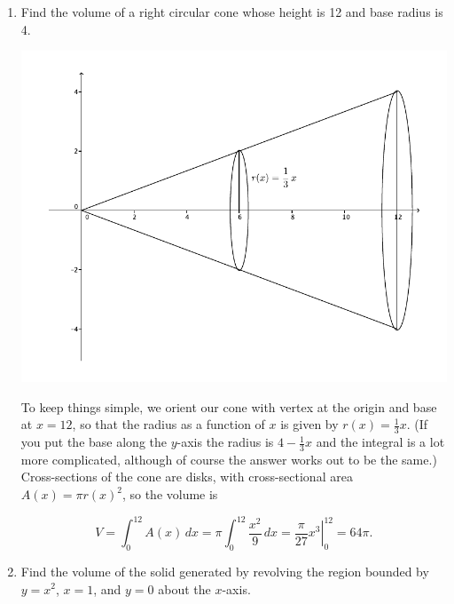 \documentclass[12pt]{article}
\begin{document}
\begin{enumerate}
 \item Find the volume of a right circular cone whose height is 12 and base radius is 4.
 
 \medskip

\begin{multicols}{2} 
\begin{center}
  \includegraphics[width=\columnwidth]{WS4-2b}
\end{center}

To keep things simple, we orient our cone with vertex at the origin and base at $x=12$, so that the radius as a function of $x$ is given by $r(x)=\frac{1}{3}x$. (If you put the base along the $y$-axis the radius is $4-\frac{1}{3}x$ and the integral is a lot more complicated, although of course the answer works out to be the same.)
 Cross-sections of the cone are disks, with cross-sectional area $A(x) = \pi r(x)^2$, so the volume is
 \end{multicols}
\[
 V = \int_0^{12}A(x)\,dx = \pi\int_0^{12}\frac{x^2}{9}\,dx = \left.\frac{\pi}{27}x^3\right|_0^{12} = 64\pi.
\]

 \item Find the volume of the solid generated by revolving the region bounded by $y=x^2$, $x=1$, and $y=0$ about the $x$-axis.
 
 \medskip
 

\end{enumerate}
\end{document}
